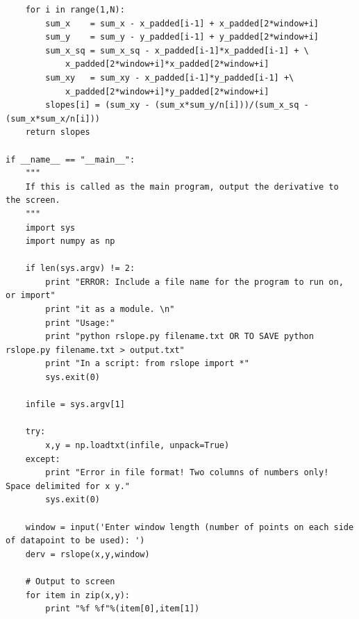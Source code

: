 \documentclass[a4paper,11pt,oneside]{article}
\begin{document}
\begin{lstlisting}
    for i in range(1,N):
        sum_x    = sum_x - x_padded[i-1] + x_padded[2*window+i]
        sum_y    = sum_y - y_padded[i-1] + y_padded[2*window+i]
        sum_x_sq = sum_x_sq - x_padded[i-1]*x_padded[i-1] + \
            x_padded[2*window+i]*x_padded[2*window+i]
        sum_xy   = sum_xy - x_padded[i-1]*y_padded[i-1] +\
            x_padded[2*window+i]*y_padded[2*window+i]
        slopes[i] = (sum_xy - (sum_x*sum_y/n[i]))/(sum_x_sq - (sum_x*sum_x/n[i]))
    return slopes

if __name__ == "__main__":    
    """
    If this is called as the main program, output the derivative to the screen.
    """
    import sys
    import numpy as np
    
    if len(sys.argv) != 2:
        print "ERROR: Include a file name for the program to run on, or import"
        print "it as a module. \n"
        print "Usage:"
        print "python rslope.py filename.txt OR TO SAVE python rslope.py filename.txt > output.txt"
        print "In a script: from rslope import *"
        sys.exit(0)
    
    infile = sys.argv[1]

    try:
        x,y = np.loadtxt(infile, unpack=True)
    except:
        print "Error in file format! Two columns of numbers only! Space delimited for x y."
        sys.exit(0)
        
    window = input('Enter window length (number of points on each side of datapoint to be used): ')
    derv = rslope(x,y,window)
    
    # Output to screen
    for item in zip(x,y):
        print "%f %f"%(item[0],item[1])
\end{lstlisting}
\end{document}
